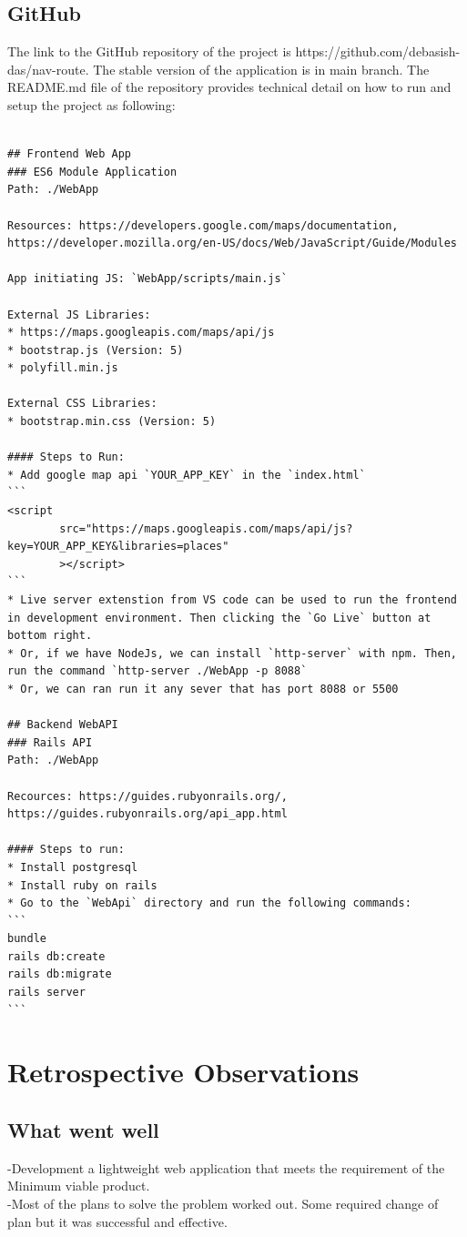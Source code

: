 \documentclass{article}
\begin{document}
\subsection{GitHub}
The link to the GitHub repository of the project is https://github.com/debasish-das/nav-route. The stable version of the application is in main branch. The README.md file of the repository provides technical detail on how to run and setup the project as following:
\\
\\
\begin{verbatim}
## Frontend Web App
### ES6 Module Application
Path: ./WebApp

Resources: https://developers.google.com/maps/documentation, https://developer.mozilla.org/en-US/docs/Web/JavaScript/Guide/Modules

App initiating JS: `WebApp/scripts/main.js`

External JS Libraries:
* https://maps.googleapis.com/maps/api/js
* bootstrap.js (Version: 5)
* polyfill.min.js

External CSS Libraries:
* bootstrap.min.css (Version: 5)

#### Steps to Run:
* Add google map api `YOUR_APP_KEY` in the `index.html`
```
<script 
        src="https://maps.googleapis.com/maps/api/js?key=YOUR_APP_KEY&libraries=places"
        ></script>
```
* Live server extenstion from VS code can be used to run the frontend in development environment. Then clicking the `Go Live` button at bottom right.
* Or, if we have NodeJs, we can install `http-server` with npm. Then, run the command `http-server ./WebApp -p 8088`
* Or, we can ran run it any sever that has port 8088 or 5500

## Backend WebAPI
### Rails API 
Path: ./WebApp

Recources: https://guides.rubyonrails.org/, https://guides.rubyonrails.org/api_app.html

#### Steps to run:
* Install postgresql
* Install ruby on rails
* Go to the `WebApi` directory and run the following commands:
```
bundle
rails db:create
rails db:migrate
rails server
```
\end{verbatim}


\section{Retrospective Observations}
\subsection{What went well}
-Development a lightweight web application that meets the requirement of the Minimum viable product.\\
-Most of the plans to solve the problem worked out. Some required change of plan but it was successful and effective. \\
\end{document}
